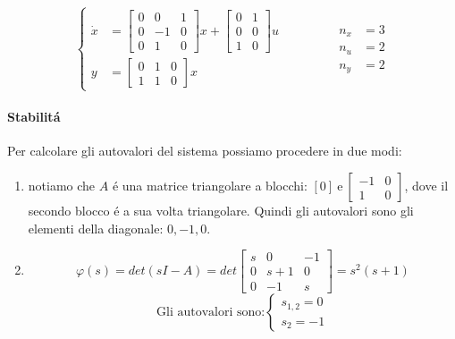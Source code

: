 
	\begin{mdframed}[style=Exercise]
		\begin{Exercise}[title={Studio completo del sistema e stabilizzazione}, difficulty=3]
			\[
				\begin{cases}			
					\dot x &=
					\begin{bmatrix}
						0 & 0 & 1\\
						0 & -1 & 0\\
						0 & 1 & 0
					\end{bmatrix} x+
					\begin{bmatrix}
						0 & 1\\
						0 & 0\\
						1 & 0
					\end{bmatrix} u
					\\[.75cm]
					y &=
					\begin{bmatrix}
						0 & 1 & 0\\
						1 & 1 & 0
					\end{bmatrix} x
				\end{cases}
				\qquad\qquad
				\begin{aligned}
					n_x &= 3\\
					n_u &= 2\\
					n_y &= 2
				\end{aligned}
			\]
			
			\paragraph{Stabilit\'a}
				Per calcolare gli autovalori del sistema possiamo procedere in due modi:
				\begin{enumerate}
					\item
						notiamo che $ A $ \'e una matrice triangolare a blocchi: $ [0]\ \text{e}\ \begin{bmatrix} -1 & 0\\ 1 & 0 \end{bmatrix} $, dove il secondo blocco \'e a sua volta triangolare. Quindi gli autovalori sono gli elementi della diagonale: $ 0, -1, 0 $.
					\item
						\[
							\varphi(s) = det(sI-A) = det
							\begin{bmatrix}
								s & 0 & -1\\
								0 & s+1 & 0\\
								0 & -1 & s
							\end{bmatrix} = s^2(s+1)
						\]
						\[ 
							\text{Gli autovalori sono:}
							\begin{cases}
								s_{1,2} = 0\\
								s_2 = -1
							\end{cases}
						\]
				\end{enumerate}
				

\end{Exercise}
\end{mdframed}
